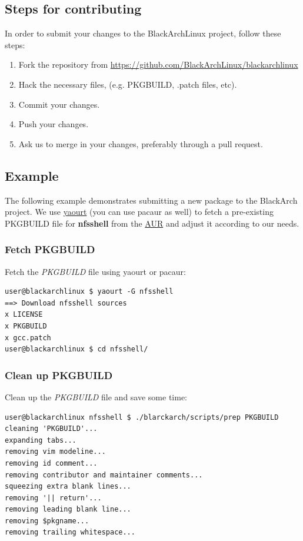 \documentclass[a4paper, oneside, 11pt]{book}
\begin{document}
\subsection{Steps for contributing}
In order to submit your changes to the BlackArchLinux project, follow these
steps:
\begin{enumerate}
\item Fork the repository from
\url{https://github.com/BlackArchLinux/blackarchlinux}
\item Hack the necessary files, (e.g. PKGBUILD, .patch files, etc).
\item Commit your changes.
\item Push your changes.
\item Ask us to merge in your changes, preferably through a pull request.
\end{enumerate}

\subsection{Example}
The following example demonstrates submitting a new package to the BlackArch
project. We use \href{https://wiki.archlinux.org/index.php/yaourt}{yaourt}
(you can use pacaur as well) to fetch a pre-existing PKGBUILD file for
\textbf{nfsshell} from the \href{https://aur.archlinux.org/}{AUR} and adjust it
according to our needs.

\subsubsection{Fetch PKGBUILD}
Fetch the \textit{PKGBUILD} file using yaourt or pacaur:
{\small
\color{gray}
\begin{verbatim}
user@blackarchlinux $ yaourt -G nfsshell
==> Download nfsshell sources
x LICENSE
x PKGBUILD
x gcc.patch
user@blackarchlinux $ cd nfsshell/
\end{verbatim}
}

\subsubsection{Clean up PKGBUILD}
Clean up the \textit{PKGBUILD} file and save some time:
{\small
\color{gray}
\begin{verbatim}
user@blackarchlinux nfsshell $ ./blarckarch/scripts/prep PKGBUILD
cleaning 'PKGBUILD'...
expanding tabs...
removing vim modeline...
removing id comment...
removing contributor and maintainer comments...
squeezing extra blank lines...
removing '|| return'...
removing leading blank line...
removing $pkgname...
removing trailing whitespace...
\end{verbatim}
}
\end{document}

